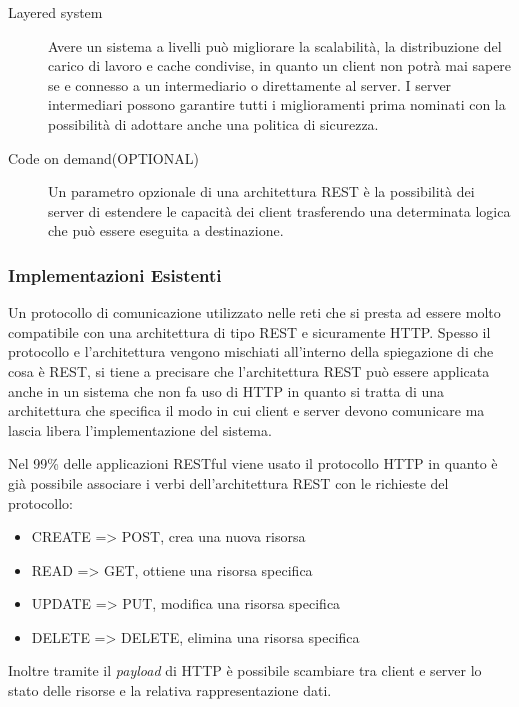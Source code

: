 \begin{description}
\item[Layered system]

Avere un sistema a livelli può migliorare la scalabilità, la distribuzione del carico di lavoro e cache condivise, in quanto un client non potrà mai sapere se e connesso a un intermediario o direttamente al server. I server intermediari possono garantire tutti i miglioramenti prima nominati con la possibilità di adottare anche una politica di sicurezza.

\item[Code on demand(OPTIONAL)]

Un parametro opzionale di una architettura REST è la possibilità dei server di estendere le capacità dei client trasferendo una determinata logica che può essere eseguita a destinazione.

\end{description}

\subsubsection{Implementazioni Esistenti}

Un protocollo di comunicazione utilizzato nelle reti che si presta ad essere molto compatibile con una architettura di tipo REST e sicuramente HTTP. Spesso il protocollo e l'architettura vengono mischiati all'interno della spiegazione di che cosa è REST, si tiene a precisare che l'architettura REST può essere applicata anche in un sistema che non fa uso di HTTP in quanto si tratta di una architettura che specifica il modo in cui client e server devono comunicare ma lascia libera l'implementazione del sistema.

Nel 99\% delle applicazioni RESTful viene usato il protocollo HTTP in quanto è già possibile associare i verbi dell'architettura REST con le richieste del protocollo: 
\begin{itemize}
\item CREATE => POST, crea una nuova risorsa
\item READ => GET, ottiene una risorsa specifica
\item UPDATE => PUT, modifica una risorsa specifica
\item DELETE => DELETE, elimina una risorsa specifica
\end{itemize}
Inoltre tramite il \emph{payload} di HTTP è possibile scambiare tra client e server lo stato delle risorse e la relativa rappresentazione dati.

